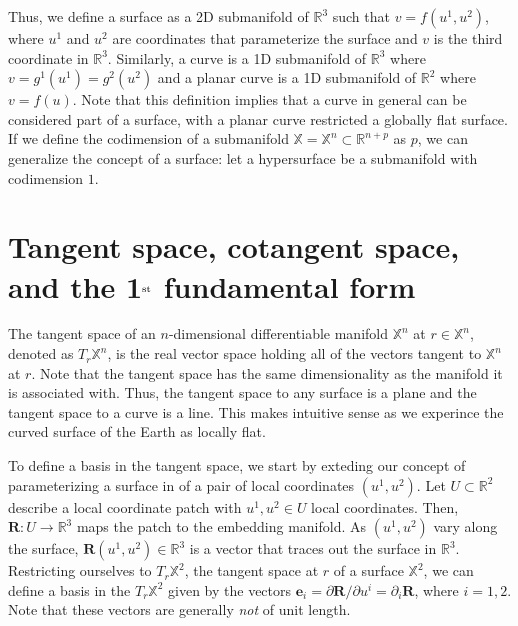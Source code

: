 \begin{appendices}
Thus, we define a surface as a 2D submanifold of $\mathbb{R}^3$ such that $v = f(u^1,u^2)$, where $u^1$ and $u^2$ are coordinates that parameterize the surface and $v$ is the third coordinate in $\mathbb{R}^3$.
Similarly, a curve is a 1D submanifold of $\mathbb{R}^3$ where $v = g^1(u^1) = g^2(u^2)$ and a planar curve is a 1D submanifold of $\mathbb{R}^2$ where $v = f(u)$.
Note that this definition implies that a curve in general can be considered part of a surface, with a planar curve restricted a globally flat surface.
If we define the codimension of a submanifold $\mathbb{X} = \mathbb{X}^n \subset \mathbb{R}^{n + p}$ as $p$, we can generalize the concept of a surface: let a hypersurface be a submanifold with codimension $1$.




\section{Tangent space, cotangent space, and the 1$^{\rm st}$ fundamental form }
The tangent space of an $n$-dimensional differentiable manifold $\mathbb{X}^n$ at $r\in \mathbb{X}^n$, denoted as $T_r\mathbb{X}^n$, is the real vector space holding all of the vectors tangent to $\mathbb{X}^n$ at $r$.
Note that the tangent space has the same dimensionality as the manifold it is associated with.
Thus, the tangent space to any surface is a plane and the tangent space to a curve is a line.
This makes intuitive sense as we experince the curved surface of the Earth as locally flat.

To define a basis in the tangent space, we start by exteding our concept of parameterizing a surface in of a pair of local coordinates $(u^1,u^2)$.
Let $U \subset \mathbb{R}^2$ describe a local coordinate patch with $u^1,u^2 \in U$ local coordinates. Then, $\mathbf{R}:U \rightarrow \mathbb{R}^3$ maps the patch to the embedding manifold.
As $(u^1,u^2)$ vary along the surface, $\mathbf{R}(u^1,u^2) \in \mathbb{R}^3$ is a vector that traces out the surface in $\mathbb{R}^3$.
Restricting ourselves to $T_r\mathbb{X}^2$, the tangent space at $r$ of a surface $\mathbb{X}^2$, we can define a basis in the $T_r\mathbb{X}^2$ given by the vectors $\mathbf{e}_i = \partial \mathbf{R} / \partial u^i = \partial_i \mathbf{R}$, where $i = 1,2$.
Note that these vectors are generally \emph{not} of unit length.


\end{appendices}

